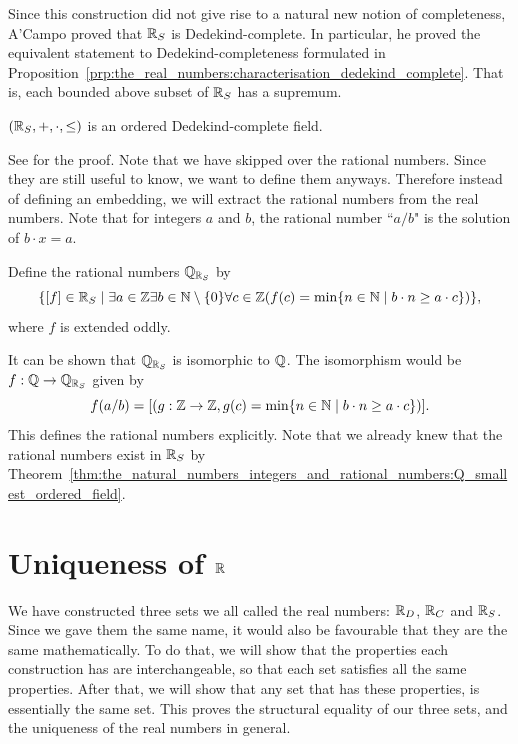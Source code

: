 \documentclass[../main.tex]{subfiles}
\begin{document}
Since this construction did not give rise to a natural new notion of completeness, A'Campo proved that $\mathbb{R}_S$ is Dedekind-complete. In particular, he proved the equivalent statement to Dedekind-completeness formulated in Proposition~\ref{prp:the_real_numbers:characterisation_dedekind_complete}. That is, each bounded above subset of $\mathbb{R}_S$ has a supremum.
\begin{proposition}\label{prp:the_real_numbers:schanuel_R_dedekind_complete}
    $(\mathbb{R}_S,+,\cdot,\leq)$ is an ordered Dedekind-complete field.
\end{proposition}
See \cite{ACampo2003} for the proof. Note that we have skipped over the rational numbers. Since they are still useful to know, we want to define them anyways. Therefore instead of defining an embedding, we will extract the rational numbers from the real numbers. Note that for integers $a$ and $b$, the rational number ``$a/b$" is the solution of $b\cdot x=a$.
\begin{definition}
    Define the rational numbers $\mathbb{Q}_{\mathbb{R}_S}$ by
    \begin{equation*}
        \{[f]\in\mathbb{R}_S\mid\exists a\in\mathbb{Z}\exists b\in\mathbb{N}\setminus\{0\}\forall c\in\mathbb{Z}(f(c)=\min\{n\in\mathbb{N}\mid b\cdot n\geq a\cdot c\})\},
    \end{equation*}
    where $f$ is extended oddly.
\end{definition}
It can be shown that $\mathbb{Q}_{\mathbb{R}_S}$ is isomorphic to $\mathbb{Q}$. The isomorphism would be $f:\mathbb{Q}\to\mathbb{Q}_{\mathbb{R}_S}$ given by 
\begin{equation*}
    f(a/b)=[(g:\mathbb{Z}\to\mathbb{Z},g(c)=\min\{n\in\mathbb{N}\mid b\cdot n\geq a\cdot c\})].
\end{equation*}
This defines the rational numbers explicitly. Note that we already knew that the rational numbers exist in $\mathbb{R}_S$ by Theorem~\ref{thm:the_natural_numbers_integers_and_rational_numbers:Q_smallest_ordered_field}.

\section{Uniqueness of \texorpdfstring{$\mathbb{R}$}{ℝ}}\label{sec:the_real_numbers:uniqueness_of_R}
We have constructed three sets we all called the real numbers: $\mathbb{R}_D$, $\mathbb{R}_C$ and $\mathbb{R}_S$. Since we gave them the same name, it would also be favourable that they are the same mathematically. To do that, we will show that the properties each construction has are interchangeable, so that each set satisfies all the same properties. After that, we will show that any set that has these properties, is essentially the same set. This proves the structural equality of our three sets, and the uniqueness of the real numbers in general.
\end{document}
